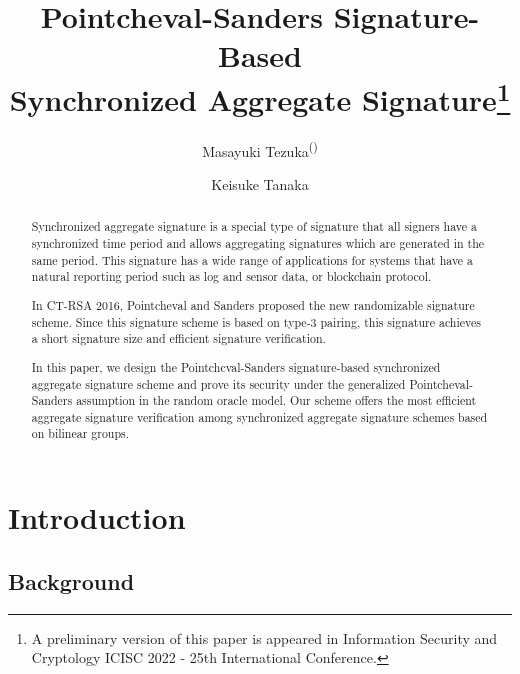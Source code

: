 \documentclass[a4paper,11pt]{fullverllncs}
\begin{document}
\title{Pointcheval-Sanders Signature-Based \\Synchronized Aggregate Signature\thanks{A preliminary version \cite{TT22} of this paper is appeared in Information Security and Cryptology  {ICISC} 2022  - 25th International Conference.}}
\author{Masayuki Tezuka\textsuperscript{(\Letter)} \and Keisuke Tanaka}



\maketitle
\pagestyle{plain}
\noindent
{}              

\begin{abstract}
Synchronized aggregate signature is a special type of signature that all signers have a synchronized time period and allows aggregating signatures which are generated in the same period.
This signature has a wide range of applications for systems that have a natural reporting period such as log and sensor data, or blockchain protocol.

In CT-RSA 2016, Pointcheval and Sanders proposed the new randomizable signature scheme.
Since this signature scheme is based on type-3 pairing, this signature achieves a short signature size and efficient signature verification.

In this paper, we design the Pointchcval-Sanders signature-based synchronized aggregate signature scheme and prove its security under the generalized Pointcheval-Sanders assumption in the random oracle model.
Our scheme offers the most efficient aggregate signature verification among synchronized aggregate signature schemes based on bilinear groups.



\end{abstract}

\section{Introduction}
\subsection{Background}\label{IntroBack}
\end{document}
